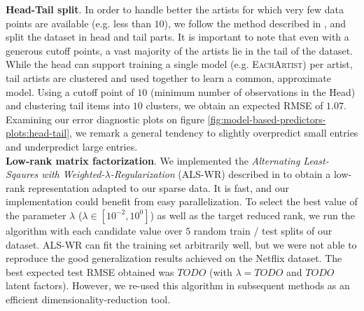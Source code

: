 \documentclass[10pt,a4paper]{article}
\begin{document}
    \noindent
    \textbf{Head-Tail split}. In order to handle better the artists for which very few data points are available (e.g. less than $10$), we follow the method described in \cite{long-tail-recommender}, and split the dataset in head and tail parts. It is important to note that even with a generous cutoff points, a vast majority of the artists lie in the tail of the dataset. While the head can support training a single model (e.g. \textsc{EachArtist}) per artist, tail artists are clustered and used together to learn a common, approximate model. Using a cutoff point of $10$ (minimum number of observations in the Head) and clustering tail items into $10$ clusters, we obtain an expected RMSE of $1.07$. Examining our error diagnostic plots on figure \ref{fig:model-based-predictors-plots:head-tail}, we remark a general tendency to slightly overpredict small entries and underpredict large entries.\\

    \noindent
    \textbf{Low-rank matrix factorization}. We implemented the \textit{Alternating Least-Sqaures with Weighted-$\lambda$-Regularization} (ALS-WR) described in \cite{alswr} to obtain a low-rank representation adapted to our sparse data. It is fast, and our implementation could benefit from easy parallelization. To select the best value of the parameter $\lambda$ ($\lambda \in [10^{-2},10^0]$) as well as the target reduced rank, we run the algorithm with each candidate value over $5$ random train / test splits of our dataset. ALS-WR can fit the training set arbitrarily well, but we were not able to reproduce the good generalization results achieved \cite{alswr} on the Netflix dataset. The best expected test RMSE obtained was $TODO$ (with $\lambda = TODO$ and $TODO$ latent factors). However, we re-used this algorithm in subsequent methods as an efficient dimensionality-reduction tool.
\end{document}
